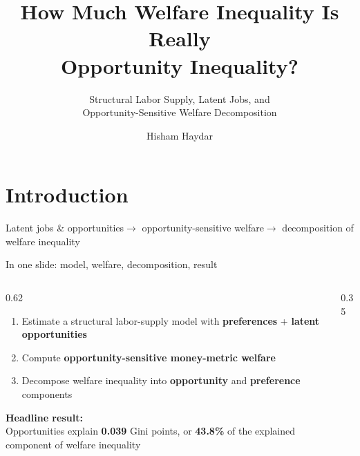 \documentclass[aspectratio=169,11pt]{beamer}
\title{How Much Welfare Inequality Is Really\\Opportunity Inequality?}
\subtitle{Structural Labor Supply, Latent Jobs, and\\
Opportunity-Sensitive Welfare Decomposition}
\author{Hisham Haydar}
\institute{}
\date{}
\newcommand{\emphnum}[1]{\textcolor{cblue}{\textbf{#1}}}
\begin{document}

\section{Introduction}

\begin{frame}[plain]
\titlepage
\vspace{-0.8cm}
\begin{center}
\footnotesize
\textcolor{cgrey}{%
Latent jobs \& opportunities\;$\rightarrow$\;
opportunity-sensitive welfare\;$\rightarrow$\;
decomposition of welfare inequality}
\end{center}
\end{frame}

\begin{frame}{In one slide: model, welfare, decomposition, result}

\begin{columns}[T]
\begin{column}{0.62\textwidth}
\begin{enumerate}
\item Estimate a structural labor-supply model with \textbf{preferences} + \textbf{latent opportunities}
\item Compute \textbf{opportunity-sensitive money-metric welfare}
\item Decompose welfare inequality into \textbf{opportunity} and \textbf{preference} components
\end{enumerate}

\bigskip
\textbf{Headline result:}\\
Opportunities explain \emphnum{0.039} Gini points, or \emphnum{43.8\%} of the explained component of welfare inequality
\end{column}
\begin{column}{0.35\textwidth}
\centering
{}
\end{column}
\end{columns}
\end{frame}
\end{document}
